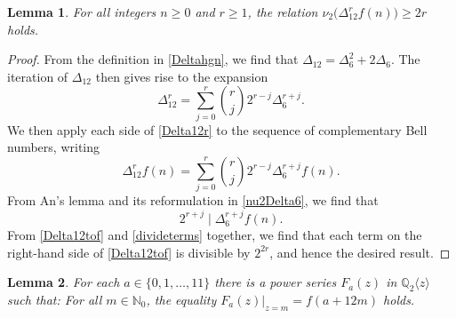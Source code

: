 \documentclass[11pt,letterpaper]{amsart}
\newtheorem{lemma}{Lemma}%
\begin{document}
\begin{lemma}\label{nu2Delta12}
 For all integers $n \geq 0$ and $r \geq 1$, the relation $ \nu_2\big( \Delta_{12}^{r} f(n) \big) \geq 2 r $ holds.
\end{lemma}

\begin{proof}
 From the definition in \eqref{Deltahgn}, we find that $\Delta_{12} = \Delta_{6}^{2} + 2 \Delta_{6}$. The iteration of $\Delta_{12}$ then 
 gives rise to the expansion 
\begin{equation}\label{Delta12r}
 \Delta_{12}^{r} = \sum_{j=0}^{r} \binom{r}{j} 2^{r-j} \Delta_{6}^{r+j}. 
\end{equation}
 We then apply each side of \eqref{Delta12r} to the sequence of complementary Bell numbers, writing 
\begin{equation}\label{Delta12tof} 
 \Delta_{12}^{r} f(n) = \sum_{j=0}^{r} \binom{r}{j} 2^{r-j} \Delta_6^{r+j} f(n). 
\end{equation}
 From An's lemma and its reformulation in \eqref{nu2Delta6}, we find that 
\begin{equation}\label{divideterms}
 2^{r + j} \mid \Delta_{6}^{r+j} f(n). 
\end{equation}
 From \eqref{Delta12tof} and \eqref{divideterms} together, we find that 
 each term on the right-hand side of \eqref{Delta12tof} is divisible by $2^{2r}$, and hence 
 the desired result. 
\end{proof}

\begin{lemma}\label{lemmaFf}
 For each $a \in \{ 0, 1, \ldots, 11 \}$   there is a power series $F_{a}(z)$ in $\mathbb{Q}_{2}\langle z \rangle$   such that:   For all $m \in  
  \mathbb{N}_{0}$, the equality   $F_{a}(z) |_{z = m} = f(a + 12 m)$ holds. 
\end{lemma}
\end{document}
